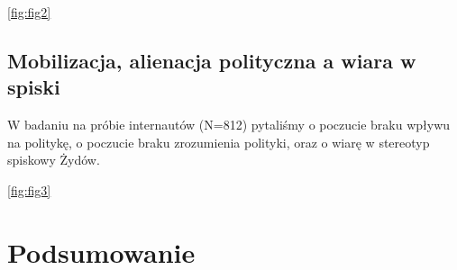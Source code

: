 \documentclass[man]{apa6}
\begin{document}
	\ref{fig:fig2}
	
	\begin{figure*}[htbp]
   		\centering
   		\caption{Kolektywny narcyzm a prawdopodobieństwo wiary w spisek smoleński wśród osób o różnych nasileniach potrzeby poznawczego domknięcia (NFC).}
   		\label{fig:fig2}
	\end{figure*}
 

    \subsection{Mobilizacja, alienacja polityczna a wiara w spiski}

    W badaniu na próbie internautów (N=812) pytaliśmy o poczucie braku wpływu na politykę, o poczucie braku zrozumienia polityki, oraz o wiarę w stereotyp spiskowy Żydów.
    
    
    	\ref{fig:fig3}
	
	\begin{figure*}[htbp]
   		\centering
   		\caption{Kolektywny narcyzm a prawdopodobieństwo wiary w spisek smoleński wśród osób o różnych nasileniach potrzeby poznawczego domknięcia (NFC).}
   		\label{fig:fig3}
	\end{figure*}


    \section{Podsumowanie}


\printbibliography
\end{document}
